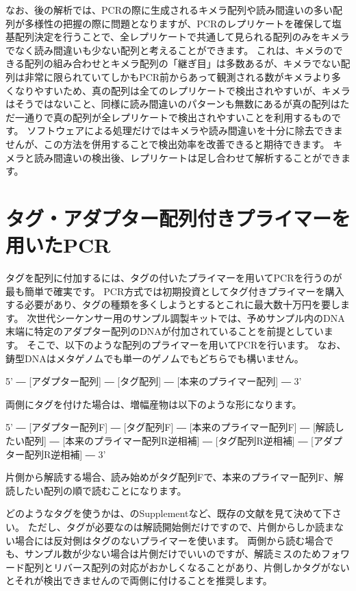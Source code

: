 \documentclass[titlepage,10pt,a4paper]{jsbook}
\newenvironment{pre}{\begin{leftbar}\raggedright\ttfamily\footnotesize\setlength{\baselineskip}{1.4em}}{\end{leftbar}\vspace{-1em}}
\begin{document}
なお、後の解析では、PCRの際に生成されるキメラ配列や読み間違いの多い配列が多様性の把握の際に問題となりますが、PCRのレプリケートを確保して塩基配列決定を行うことで、全レプリケートで共通して見られる配列のみをキメラでなく読み間違いも少ない配列と考えることができます。
これは、キメラのできる配列の組み合わせとキメラ配列の「継ぎ目」は多数あるが、キメラでない配列は非常に限られていてしかもPCR前からあって観測される数がキメラより多くなりやすいため、真の配列は全てのレプリケートで検出されやすいが、キメラはそうではないこと、同様に読み間違いのパターンも無数にあるが真の配列はただ一通りで真の配列が全レプリケートで検出されやすいことを利用するものです。
ソフトウェアによる処理だけではキメラや読み間違いを十分に除去できませんが、この方法を併用することで検出効率を改善できると期待できます。
キメラと読み間違いの検出後、レプリケートは足し合わせて解析することができます。

\section{タグ・アダプター配列付きプライマーを用いたPCR}

タグを配列に付加するには、タグの付いたプライマーを用いてPCRを行うのが最も簡単で確実です。
PCR方式では初期投資としてタグ付きプライマーを購入する必要があり、タグの種類を多くしようとするとこれに最大数十万円を要します。
次世代シーケンサー用のサンプル調製キットでは、予めサンプル内のDNA末端に特定のアダプター配列のDNAが付加されていることを前提としています。
そこで、以下のような配列のプライマーを用いてPCRを行います。
なお、鋳型DNAはメタゲノムでも単一のゲノムでもどちらでも構いません。
\begin{pre}
5' ― [アダプター配列] ― [タグ配列] ― [本来のプライマー配列] ― 3'
\end{pre}
両側にタグを付けた場合は、増幅産物は以下のような形になります。
\begin{pre}
5' ― [アダプター配列F] ― [タグ配列F] ― [本来のプライマー配列F] ― [解読したい配列] ― [本来のプライマー配列R逆相補] ― [タグ配列R逆相補] ― [アダプター配列R逆相補] ― 3'
\end{pre}
片側から解読する場合、読み始めがタグ配列Fで、本来のプライマー配列F、解読したい配列の順で読むことになります。

どのようなタグを使うかは、\citet{Hamady2008}のSupplementなど、既存の文献を見て決めて下さい。
ただし、タグが必要なのは解読開始側だけですので、片側からしか読まない場合には反対側はタグのないプライマーを使います。
両側から読む場合でも、サンプル数が少ない場合は片側だけでいいのですが、解読ミスのためフォワード配列とリバース配列の対応がおかしくなることがあり、片側しかタグがないとそれが検出できませんので両側に付けることを推奨します。
\end{document}
